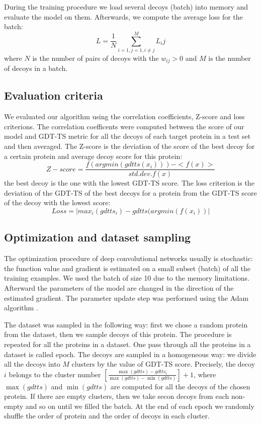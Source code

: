 \documentclass[a4paper,10pt]{article}
\begin{document}
During the training procedure we load several decoys (batch) into memory and evaluate the model on them. 
Afterwards, we compute the average loss for the batch:
$$ L = \frac{1}{N} \sum_{i=1,j=1, i \neq j}^{M} L_ij $$ 
where $N$ is the number of pairs of decoys with the $w_{ij} > 0$ and $M$ is the number of decoys in a batch.

\subsection{Evaluation criteria}
We evaluated our algorithm using the correlation coefficients, Z-score and loss criterions. The correlation coefficents 
were computed between the score of 
our model and GDT-TS metric for all the decoys of each target protein in a test set and then averaged. 
The Z-score is the deviation of the score of 
the best decoy for a certain protein and average decoy score for this protein:
$$ 
Z-score = \frac{f( argmin(gdtts(x_i)) ) - <f(x)>}{std.dev.f(x)}
$$ 
the best decoy is the one with the lowest GDT-TS score. 
The loss criterion is the deviation of the GDT-TS of the best decoys for a protein from the GDT-TS score of the decoy with the lowest score:
$$ 
Loss = | max_i( gdtts_i ) - gdtts( argmin(f(x_i) ) |
$$ 

\subsection{Optimization and dataset sampling}
The optimization procedure of deep convolutional networks usually is stochastic: the function value and gradient 
is estimated on a small subset (batch) of all the training 
examples. We used the batch of size 10 due to the memory limitations. Afterward the parameters of the model are 
changed in the direction of the estimated gradient.
The parameter update step was performed using the Adam algorithm \cite{}. 

The dataset was sampled in the following way: first we chose a random protein from the dataset, then we sample decoys of this protein. 
The procedure is repeated for all the 
proteins in a dataset. One pass through all the proteins in a dataset is called epoch. 
The decoys are sampled in a homogeneous way: we divide all the decoys into $M$ clusters by the value of GDT-TS score. 
Precisely, the decoy $i$ belongs to the cluster  
number $ \left[ \frac{\max(gdtts) - gdtts_i}{\max(gdtts) - \min(gdtts)} \right] + 1$, where $\max(gdtts)$ and $\min(gdtts)$ 
are computed for all the decoys of 
the chosen protein. If there are empty clusters, then we take secon decoys from each non-empty and so on until we filled the batch. 
At the end of each epoch we randomly
shuffle the order of protein and the order of decoys in each cluster. 
\end{document}
